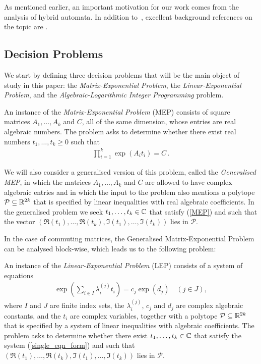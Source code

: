 As mentioned earlier, an important motivation for our work comes from
the analysis of hybrid automata. In addition to~\cite{Alu15},
excellent background references on the topic are
\cite{HenzingerSTOC,HenzingerLICS}.

\subsection{Decision Problems}

We start by defining three decision problems that will be the main
object of study in this paper: the \emph{Matrix-Exponential Problem},
the \emph{Linear-Exponential Problem}, and the
\emph{Algebraic-Logarithmic Integer Programming} problem.

\begin{definition}
  An instance of the \emph{Matrix-Exponential Problem} (MEP) consists of
  square matrices $A_{1}, \ldots, A_{k}$ and $C$, all of the same
  dimension, whose entries are real algebraic numbers.  The problem
asks to determine whether there exist real numbers
$t_1,\ldots,t_k \geq 0$ such that
\begin{align}
\label{MEP}
\prod \limits_{i=1}^{k} \exp(A_{i} t_{i}) = C \, .
\end{align}
\label{def:MEP}
\end{definition}

We will also consider a generalised version of this problem, called
the \emph{Generalised MEP}, in which the matrices $A_1,\ldots,A_k$ and
$C$ are allowed to have complex algebraic entries and in which the
input to the problem also mentions a polytope
$\mathcal{P}\subseteq\mathbb{R}^{2k}$ that is specified by linear
inequalities with real algebraic coefficients.  In the generalised problem
we seek $t_1,\ldots,t_k \in \mathbb{C}$ that satisfy (\ref{MEP}) and
such that the vector
$(\Re(t_1),\ldots,\Re(t_k),
\Im(t_1),\ldots,\Im(t_k))$ lies in $\mathcal{P}$.

In the case of commuting matrices, the Generalised Matrix-Exponential
Problem can be analysed block-wise, which leads us to the following
problem:

\begin{definition}
  An instance of the \emph{Linear-Exponential Problem} (LEP) consists of a system
  of equations
\begin{align}
\label{single_eqn_form}
  \exp\left(\sum_{i \in I} \lambda_i^{(j)} t_i \right) = c_j \exp (d_j)
\quad (j \in J),
\end{align}
where $I$ and $J$ are finite index sets, the $\lambda_i^{(j)}$, $c_j$
and $d_j$ are complex algebraic constants, and the $t_i$ are complex
variables, together with a polytope
$\mathcal{P} \subseteq \mathbb{R}^{2k}$ that is specified by a system
of linear inequalities with algebraic coefficients.  The problem asks
to determine whether there exist $t_1,\ldots,t_k\in \mathbb{C}$ that
satisfy the system (\ref{single_eqn_form}) and such that
$(\Re(t_1),\ldots,\Re(t_k),\Im(t_1),\ldots,\Im(t_k))$
lies in $\mathcal{P}$.
\label{def:LEP}
\end{definition}

